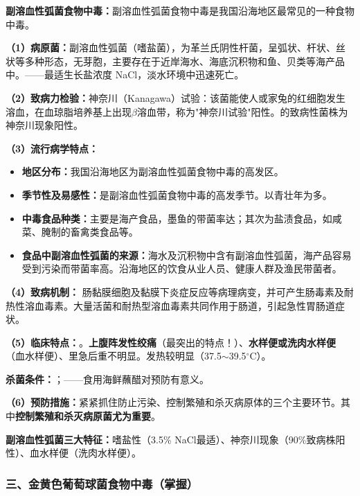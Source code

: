 \begin{keybox}
\textbf{副溶血性弧菌食物中毒：}副溶血性弧菌食物中毒是我国沿海地区最常见的一种食物中毒。

\textbf{（1）病原菌：}副溶血性弧菌（嗜盐菌），为革兰氏阴性杆菌，呈弧状、杆状、丝状等多种形态，无芽胞，主要存在于近岸海水、海底沉积物和鱼、贝类等海产品中。——最适生长盐浓度 NaCl，淡水环境中迅速死亡。

\textbf{（2）致病力检验：}神奈川（Kanagawa）试验：该菌能使人或家兔的红细胞发生溶血，在血琼脂培养基上出现$\beta$溶血带，称为"神奈川试验"阳性。的致病性菌株为神奈川现象阳性。

\textbf{（3）流行病学特点：}
\begin{itemize}[leftmargin=*]
    \item \textbf{地区分布：}我国沿海地区为副溶血性弧菌食物中毒的高发区。
    \item \textbf{季节性及易感性：}是副溶血性弧菌食物中毒的高发季节。以青壮年为多。
    \item \textbf{中毒食品种类：}主要是海产食品，墨鱼的带菌率达；其次为盐渍食品，如咸菜、腌制的畜禽类食品等。
    \item \textbf{食品中副溶血性弧菌的来源：}海水及沉积物中含有副溶血性弧菌，海产品容易受到污染而带菌率高。沿海地区的饮食从业人员、健康人群及渔民带菌者。
\end{itemize}

\textbf{（4）致病机制：}\difficulty
肠黏膜细胞及黏膜下炎症反应等病理病变，并可产生肠毒素及耐热性溶血毒素。大量活菌和耐热型溶血毒素共同作用于肠道，引起急性胃肠道症状。

\textbf{（5）临床特点：}。\textbf{上腹阵发性绞痛}（最突出的特点！）、\textbf{水样便或洗肉水样便}（血水样便）、里急后重不明显。发热较明显（37.5$\sim$39.5$^\circ$C）。

\textbf{杀菌条件：}；——食用海鲜蘸醋对预防有意义。

\textbf{（6）预防措施：}紧紧抓住防止污染、控制繁殖和杀灭病原体的三个主要环节。其中\textbf{控制繁殖和杀灭病原菌尤为重要}。
\end{keybox}

\begin{exambox}
\textbf{副溶血性弧菌三大特征：}嗜盐性（3.5\% NaCl最适）、神奈川现象（90\%致病株阳性）、血水样便（洗肉水样便）。
\end{exambox}

\subsubsection{三、金黄色葡萄球菌食物中毒（掌握）}

